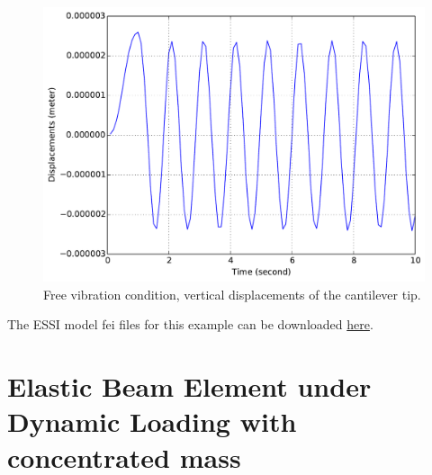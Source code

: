 \documentclass[fleqn,11pt]{article}
\begin{document}
\begin{figure}[!htb]
  \centering
  \includegraphics[width=12cm]{../Figure-files/_Chapter_Appendix_Illustrative_Examples/brick-5element-freeVibration.pdf}
  \caption{Free vibration condition, vertical displacements of the cantilever tip.}
  \label{fig_brick5-freevib}
\end{figure}




The    ESSI   model   fei   files   for   this   example   can   be   downloaded
\href{https://github.com/BorisJeremic/Real-ESSI-Examples/blob/master/model_fei_file/27NodeBrick_5element_dynamic/27NodeBrick_5element_dynamic.tgz?raw=true}{here}.


















\newpage
\section{Elastic Beam Element under Dynamic Loading with concentrated mass} ~ 
\end{document}
